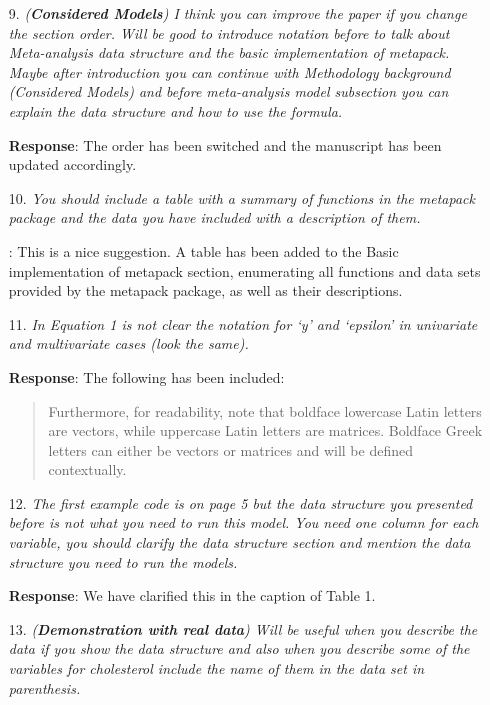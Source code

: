\documentclass[11pt]{article}
\newcommand{\1}{{\bf{{1}}}}
\begin{document}
\begin{itemize}
\item[9.] {\it (\textbf{Considered Models}) I think you can improve the paper if you change the section order. Will be good to introduce notation before to talk about Meta-analysis data structure and the basic implementation of metapack. Maybe after introduction you can continue with Methodology background (Considered Models) and before meta-analysis model subsection you can explain the data structure and how to use the formula.}

\medskip
\noindent
{\bf Response}: The order has been switched and the manuscript has been updated accordingly.


\item[10.] {\it You should include a table with a summary of functions in the metapack package and the data you have included with a description of them.}

\medskip
{}: This is a nice suggestion. A table has been added to the Basic implementation of metapack section, enumerating all functions and data
sets provided by the metapack package, as well as their descriptions.


\item[11.] {\it In Equation 1 is not clear the notation for `y' and `epsilon' in univariate and multivariate cases (look the same).}

\medskip
\noindent
{\bf Response}: The following has been included:
\begin{quote}
    Furthermore, for readability, note that boldface lowercase Latin letters are vectors, while uppercase Latin letters are matrices. Boldface Greek letters can either be vectors or matrices and will be defined contextually.
\end{quote}


\item[12.] {\it The first example code is on page 5 but the data structure you presented before is not what you need to run this model. You need one column for each variable, you should clarify the data structure section and mention the data structure you need to run the models.}

\medskip
\noindent
{\bf Response}: We have clarified this in the caption of Table 1.


\item[13.] {\it (\textbf{Demonstration with real data}) Will be useful when you describe the data if you show the data structure and also when you describe some of the variables for cholesterol include the name of them in the data set in parenthesis.}


\end{itemize}
\end{document}
